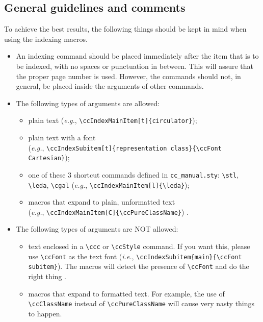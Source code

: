 \documentclass[11pt]{article}
\makeatletter
\newcommand{\Mindex}[1]{\index{#1@\protect\Backslash{\tt #1}}}
\makeatother
\begin{document}
\subsection{General guidelines and comments}
\label{general_guidelines}


To achieve the best results, the following things should be
kept in mind when using the indexing macros.
\begin{itemize}
   \item An indexing command should be placed
         immediately after the
         item that is to be indexed, with no spaces or punctuation
         in between.  This will assure that the proper page number is used.
         However, the commands should not, in general, be placed inside the 
         arguments of other commands.
   \item The following types of arguments are allowed:
         \begin{itemize}
           \item plain text ({\it e.g.}, \verb|\ccIndexMainItem[t]{circulator}|);
           \item plain text with a font%
                  \\
                 ({\it e.g.}, \verb|\ccIndexSubitem[t]{representation class}{\ccFont Cartesian}|);
           \item one of these 3 shortcut commands defined in
                 \verb|cc_manual.sty|: \verb|\stl|\Mindex{stl}, 
                 \verb|\leda|\Mindex{leda}, \verb|\cgal|\Mindex{cgal}
                 ({\it e.g.}, \verb|\ccIndexMainItem[l]{\leda}|);
           \item macros that expand to plain, unformatted text \\
                 ({\it e.g.}, \verb|\ccIndexMainItem[C]{\ccPureClassName}|)
                 .
         \end{itemize}
   \item The following types of arguments are NOT allowed:
         \begin{itemize}
           \item text enclosed in a \verb|\ccc| or \verb|\ccStyle| command.  
                 If you want this, please use \verb|\ccFont| as the text font 
                 ({\it i.e.}, \verb|\ccIndexSubitem{main}{\ccFont subitem}|).
                 The macros will detect the presence of \verb|\ccFont| 
                 and do the right thing%
                 .
           \item macros that expand to formatted text.
                 For example, the use of \verb|\ccClassName| instead of 
                 \verb|\ccPureClassName| will 
                 cause very nasty things to happen.  


\end{itemize}
\end{itemize}
\end{document}
